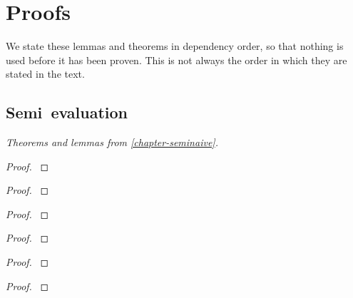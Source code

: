 \chapter{Proofs}

We state these lemmas and theorems in dependency order, so that nothing is used
before it has been proven. This is not always the order in which they are stated
in the text.

\section{Semi\naive\ evaluation}

\emph{Theorems and lemmas from \cref{chapter-seminaive}.}

\PhiDeltaWellTyped*
\begin{proof}\label{proof-phi-delta-well-typed}
\end{proof}

\EqualityChanges*
\begin{proof}
  \label{proof-equality-changes}
\end{proof}

\EqualityDummy*
\begin{proof}
  \label{proof-equality-dummy}
\end{proof}

\DiscreteContexts*
\begin{proof}
  \label{proof-discrete-contexts}
\end{proof}

\ContextStripping*
\begin{proof}
  \label{proof-context-stripping}
\end{proof}

\SeminaiveFundamental*
\begin{proof}
  \label{proof-seminaive-fundamental}
\end{proof}
